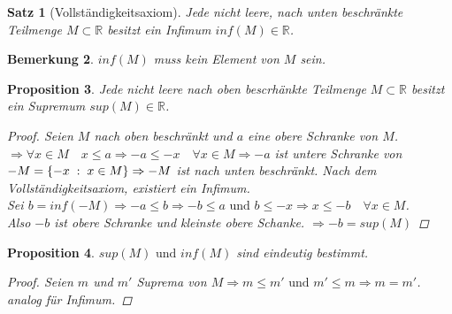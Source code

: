 \documentclass[a4paper,titlepage,oneside]{article}
\def\R{\ensuremath{\mathbb{R}} }
\def\fa{\ensuremath{\forall}}
\def\sp{\hspace{0,1cm}}
\newcommand{\menge}[2]{\ensuremath{\{#1\sp : \sp #2\}}}
\theoremstyle{thmstyle}
\newtheorem{satz}{Satz}[subsection]
\newtheorem{prop}[satz]{Proposition}
\newtheorem{bem}[satz]{Bemerkung}
\begin{document}
\begin{satz}[Vollständigkeitsaxiom]
Jede nicht leere, nach unten beschränkte Teilmenge \(M \subset \R\)  besitzt ein Infimum \(inf(M) \in \R\).
\end{satz}

\begin{bem}
\(inf(M)\) muss kein Element von \(M\) sein.
\end{bem}

\begin{prop}
Jede nicht leere nach oben bescrhänkte Teilmenge \(M \subset \R\) besitzt ein Supremum \(sup(M) \in \R\).
\begin{proof}
Seien \(M\) nach oben beschränkt und \(a\) eine obere Schranke von \(M\).\\
\(\Rightarrow \fa x \in M  \quad x \le a \Rightarrow -a \le -x \quad \fa x \in M \Rightarrow -a\) ist untere Schranke von \(-M = \menge{-x}{x \in M}\\
\Rightarrow -M\) ist nach unten beschränkt. Nach dem Vollständigkeitsaxiom, existiert ein Infimum.\\
Sei \(b= inf(-M) \Rightarrow -a \le b \Rightarrow -b \le a \text{ und } b \le -x \Rightarrow x \le -b \quad \forall x \in M\).\\
Also \(-b\) ist obere Schranke und kleinste obere Schanke. \(\Rightarrow -b = sup(M)\)
\end{proof}
\end{prop}

\begin{prop}
\(sup(M) \text{ und } inf(M)\) sind eindeutig bestimmt.
\begin{proof}
Seien \(m\) und \(m'\) Suprema von \(M \Rightarrow m \le m' \text{ und } m' \le m \Rightarrow m = m'\).\\
analog für Infimum.
\end{proof}
\end{prop}
\end{document}
